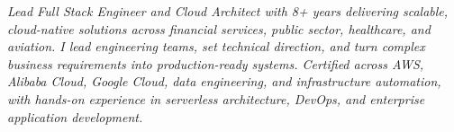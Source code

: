 
\begin{center}
    \colorbox{backgroundgray}{
        \begin{minipage}{0.95\textwidth}
            \centering
            \vspace{6pt}
            \textcolor{textgray}{\textit{Lead Full Stack Engineer and Cloud Architect with 8+ years delivering scalable, cloud-native solutions across financial services, public sector, healthcare, and aviation. I lead engineering teams, set technical direction, and turn complex business requirements into production-ready systems. Certified across AWS, Alibaba Cloud, Google Cloud, data engineering, and infrastructure automation, with hands-on experience in serverless architecture, DevOps, and enterprise application development.}}
            \vspace{6pt}
        \end{minipage}
    }
\end{center}
\vspace{6pt}